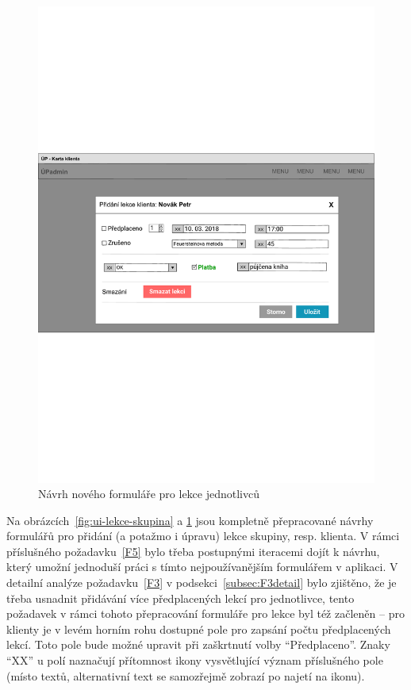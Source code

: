 \begin{figure}\centering
    \includegraphics[width=1\textwidth]{img/ui-lekce-klient}
    \caption{Návrh nového formuláře pro lekce jednotlivců}\label{fig:ui-lekce-klient}
\end{figure}

Na obrázcích~\ref{fig:ui-lekce-skupina} a \ref{fig:ui-lekce-klient} jsou kompletně přepracované návrhy formulářů pro přidání (a potažmo i úpravu) lekce skupiny, resp. klienta. V rámci příslušného požadavku~\ref{F5} bylo třeba postupnými iteracemi dojít k návrhu, který umožní jednoduší práci s tímto nejpoužívanějším formulářem v aplikaci. V detailní analýze požadavku~\ref{F3} v podsekci~\ref{subsec:F3detail} bylo zjištěno, že je třeba usnadnit přidávání více předplacených lekcí pro jednotlivce, tento požadavek v rámci tohoto přepracování formuláře pro lekce byl též začleněn -- pro klienty je v levém horním rohu dostupné pole pro zapsání počtu předplacených lekcí. Toto pole bude možné upravit při zaškrtnutí volby \enquote{Předplaceno}. Znaky \enquote{XX} u polí naznačují přítomnost ikony vysvětlující význam příslušného pole (místo textů, alternativní text se samozřejmě zobrazí po najetí na ikonu).

